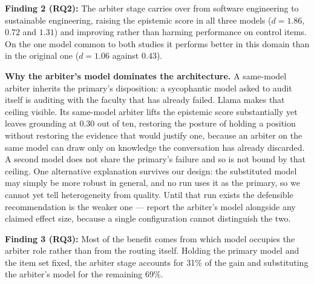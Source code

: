 \documentclass[conference]{IEEEtran}
\newenvironment{findingBox}[2]{%
    \begin{tcolorbox}[
        colframe=black!80, colback=gray!10, boxrule=0.4mm, arc=2mm,
        left=1pt, right=1pt, top=0pt, bottom=0pt, size=small,
        fonttitle=\bfseries, coltitle=black
    ]{\textbf{Finding #1:} #2}
}{%
    \end{tcolorbox}
}
\begin{document}
\begin{findingBox}{2 (RQ2)}{The arbiter stage carries over from software
engineering to sustainable engineering, raising the epistemic score in all three
models ($d=1.86$, $0.72$ and $1.31$) and improving rather than harming
performance on control items. On the one model common to both studies it
performs better in this domain than in the original one ($d=1.06$ against
$0.43$).}
\end{findingBox}

\textbf{Why the arbiter's model dominates the architecture.} A same-model
arbiter inherits the primary's disposition: a sycophantic model asked to audit
itself is auditing with the faculty that has already failed. Llama makes that
ceiling visible. Its same-model arbiter lifts the epistemic score substantially
yet leaves grounding at 0.30 out of ten, restoring the posture of holding a
position without restoring the evidence that would justify one, because an
arbiter on the same model can draw only on knowledge the conversation has
already discarded. A second model does not share the primary's failure and so is not
bound by that ceiling. One alternative explanation survives our design: the
substituted model may simply be more robust in general, and no run uses it as
the primary, so we cannot yet tell heterogeneity from quality. Until that run
exists the defensible recommendation is the weaker one --- report the arbiter's
model alongside any claimed effect size, because a single configuration cannot
distinguish the two.

\begin{findingBox}{3 (RQ3)}{Most of the benefit comes from which model occupies
the arbiter role rather than from the routing itself. Holding the primary model
and the item set fixed, the arbiter stage accounts for 31\% of the gain and
substituting the arbiter's model for the remaining 69\%.}
\end{findingBox}
\end{document}
